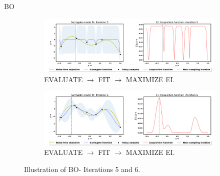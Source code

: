 \documentclass[10pt]{beamer}
\begin{document}
\begin{frame}{BO}
        \begin{figure}[!ht]
		\centering

	\begin{subfigure}{1\textwidth}
  			\centering
  			\includegraphics[scale=0.238]{images/BO5.png}
  			\caption{EVALUATE $\rightarrow$ FIT $\rightarrow$ MAXIMIZE EI.}
  			\label{fig:BO5}
		\end{subfigure}
		\begin{subfigure}{1\textwidth}
  			\centering
  			\includegraphics[scale=0.238]{images/BO6.png}
  			\caption{EVALUATE $\rightarrow$ FIT $\rightarrow$ MAXIMIZE EI.}
  			\label{fig:BO6}
		\end{subfigure}
	
\captionsetup{justification=justified}
\caption[Illustration of BO- Iterations 1 to 4.]{Illustration of BO- Iterations 5 and 6.}
\label{fig:BO_steps3}
\end{figure}
\end{frame}
\end{document}
